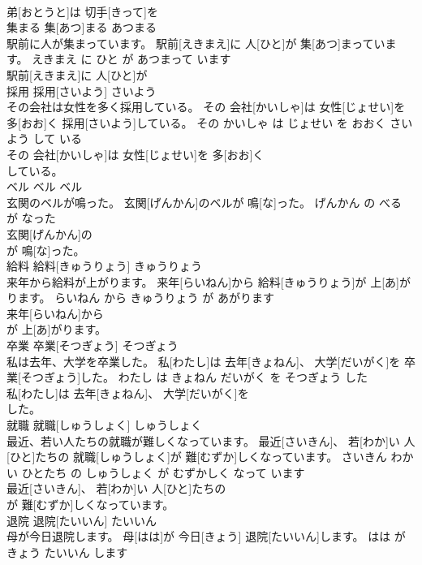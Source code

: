 \documentclass[8pt]{extreport}
\begin{document}
\begin{CJK}{UTF8}{min}
\\	弟[おとうと]は 切手[きって]を
\\	集まる	集[あつ]まる	あつまる	
\\	駅前に人が集まっています。	駅前[えきまえ]に 人[ひと]が 集[あつ]まっています。	えきまえ に ひと が あつまって います	
\\	駅前[えきまえ]に 人[ひと]が
\\	採用	採用[さいよう]	さいよう	
\\	その会社は女性を多く採用している。	その 会社[かいしゃ]は 女性[じょせい]を 多[おお]く 採用[さいよう]している。	その かいしゃ は じょせい を おおく さいよう して いる	
\\	その 会社[かいしゃ]は 女性[じょせい]を 多[おお]く
\\	している。		
\\	ベル	ベル	ベル	
\\	玄関のベルが鳴った。	玄関[げんかん]のベルが 鳴[な]った。	げんかん の べる が なった	
\\	玄関[げんかん]の
\\	が 鳴[な]った。		
\\	給料	給料[きゅうりょう]	きゅうりょう	
\\	来年から給料が上がります。	来年[らいねん]から 給料[きゅうりょう]が 上[あ]がります。	らいねん から きゅうりょう が あがります	
\\	来年[らいねん]から
\\	が 上[あ]がります。		
\\	卒業	卒業[そつぎょう]	そつぎょう	
\\	私は去年、大学を卒業した。	私[わたし]は 去年[きょねん]、 大学[だいがく]を 卒業[そつぎょう]した。	わたし は きょねん だいがく を そつぎょう した	
\\	私[わたし]は 去年[きょねん]、 大学[だいがく]を
\\	した。		
\\	就職	就職[しゅうしょく]	しゅうしょく	
\\	最近、若い人たちの就職が難しくなっています。	最近[さいきん]、 若[わか]い 人[ひと]たちの 就職[しゅうしょく]が 難[むずか]しくなっています。	さいきん わかい ひとたち の しゅうしょく が むずかしく なって います	
\\	最近[さいきん]、 若[わか]い 人[ひと]たちの
\\	が 難[むずか]しくなっています。		
\\	退院	退院[たいいん]	たいいん	
\\	母が今日退院します。	母[はは]が 今日[きょう] 退院[たいいん]します。	はは が きょう たいいん します	

\end{CJK}
\end{document}
